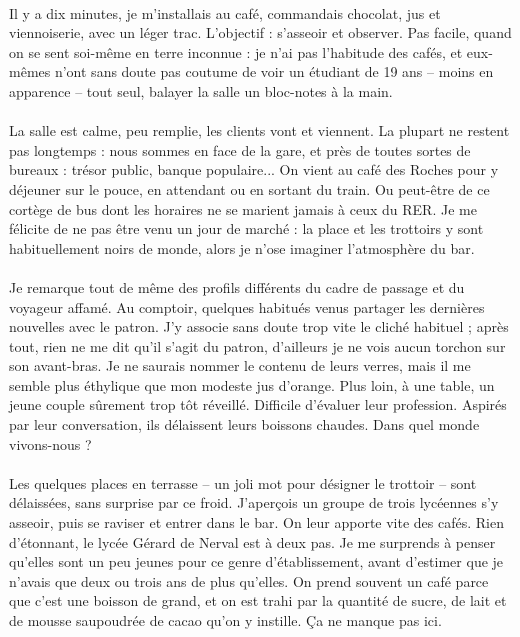 \paragraph{}
Il y a dix minutes, je m’installais au café, commandais chocolat, jus et
viennoiserie, avec un léger trac. L’objectif : s’asseoir et observer. Pas
facile, quand on se sent soi-même en terre inconnue : je n’ai pas l’habitude
des cafés, et eux-mêmes n’ont sans doute pas coutume de voir un étudiant de 19
ans – moins en apparence – tout seul, balayer la salle un bloc-notes à la main.

\paragraph{}
La salle est calme, peu remplie, les clients vont et viennent. La plupart ne
restent pas longtemps : nous sommes en face de la gare, et près de toutes
sortes de bureaux : trésor public, banque populaire... On vient au café des
Roches pour y déjeuner sur le pouce, en attendant ou en sortant du train. Ou
peut-être de ce cortège de bus dont les horaires ne se marient jamais à ceux du
RER. Je me félicite de ne pas être venu un jour de marché : la place et les
trottoirs y sont habituellement noirs de monde, alors je n’ose imaginer
l’atmosphère du bar.

\paragraph{}
Je remarque tout de même des profils différents du cadre de passage et du
voyageur affamé. Au comptoir, quelques habitués venus partager les dernières
nouvelles avec le patron. J’y associe sans doute trop vite le cliché habituel ;
après tout, rien ne me dit qu’il s’agit du patron, d’ailleurs je ne vois aucun
torchon sur son avant-bras. Je ne saurais nommer le contenu de leurs verres,
mais il me semble plus éthylique que mon modeste jus d’orange. Plus loin, à une
table, un jeune couple sûrement trop tôt réveillé. Difficile d’évaluer leur
profession. Aspirés par leur conversation, ils délaissent leurs boissons
chaudes. Dans quel monde vivons-nous ?

\paragraph{}
Les quelques places en terrasse – un joli mot pour désigner le trottoir – sont
délaissées, sans surprise par ce froid.  J’aperçois un groupe de trois
lycéennes s’y asseoir, puis se raviser et entrer dans le bar. On leur apporte
vite des cafés. Rien d’étonnant, le lycée Gérard de Nerval est à deux pas. Je
me surprends à penser qu’elles sont un peu jeunes pour ce genre
d’établissement, avant d’estimer que je n’avais que deux ou trois ans de plus
qu’elles. On prend souvent un café parce que c’est une boisson de grand, et on
est trahi par la quantité de sucre, de lait et de mousse saupoudrée de cacao
qu’on y instille. Ça ne manque pas ici.

